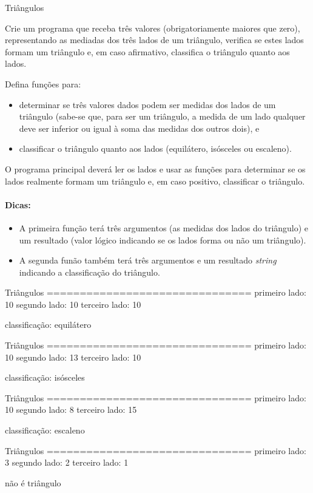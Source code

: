 \documentclass[11pt]{practice}
\begin{document}
\begin{task}[breakable]{Triângulos}{}

  Crie um programa que receba três valores (obrigatoriamente maiores que
  zero), representando as mediadas dos três lados de um triângulo,
  verifica se estes lados formam um triângulo e, em caso afirmativo,
  classifica o triângulo quanto aos lados.

  Defina funções para:
  \begin{itemize}
    \item determinar se três valores dados podem ser medidas dos lados
    de um triângulo (sabe-se que, para ser um triângulo, a medida de um
    lado qualquer deve ser inferior ou igual à soma das medidas dos
    outros dois), e
    \item classificar o triângulo quanto aos lados (equilátero,
    isósceles ou escaleno).
  \end{itemize}

  O programa principal deverá ler os lados e usar as funções para
  determinar se os lados realmente formam um triângulo e, em caso
  positivo, classificar o triângulo.

\paragraph{Dicas:}
\begin{itemize}
  \item A primeira função terá três argumentos (as medidas dos lados do
  triângulo) e um resultado (valor lógico indicando se os lados forma ou
  não um triângulo).
  \item A segunda funão também terá três argumentos e um resultado
  \emph{string} indicando a classificação do triângulo.
\end{itemize}

  \begin{runexample}
Triângulos
===============================
primeiro lado: 10
segundo lado: 10
terceiro lado: 10

classificação: equilátero
  \end{runexample}

  \begin{runexample}
Triângulos
===============================
primeiro lado: 10
segundo lado: 13
terceiro lado: 10

classificação: isósceles
   \end{runexample}

  \begin{runexample}
Triângulos
===============================
primeiro lado: 10
segundo lado: 8
terceiro lado: 15

classificação: escaleno
  \end{runexample}

  \begin{runexample}
Triângulos
===============================
primeiro lado: 3
segundo lado: 2
terceiro lado: 1

não é triângulo
  \end{runexample}

  \tcblower
  \solution
\end{task}
\end{document}
